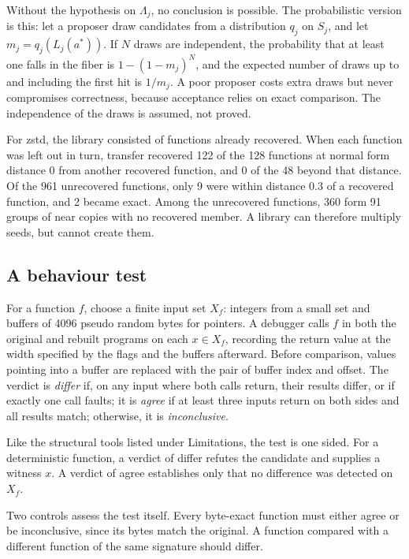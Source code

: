 \documentclass[11pt]{article}
\theoremstyle{definition}
\theoremstyle{remark}
\begin{document}
Without the hypothesis on $\Lambda_j$, no conclusion is possible. The probabilistic version is this: let a proposer draw candidates from a distribution $q_j$ on $S_j$, and let $m_j = q_j(L_j(a^*))$. If $N$ draws are independent, the probability that at least one falls in the fiber is $1 - (1 - m_j)^N$, and the expected number of draws up to and including the first hit is $1/m_j$. A poor proposer costs extra draws but never compromises correctness, because acceptance relies on exact comparison. The independence of the draws is assumed, not proved.

For zstd, the library consisted of functions already recovered. When each function was left out in turn, transfer recovered 122 of the 128 functions at normal form distance $0$ from another recovered function, and 0 of the 48 beyond that distance. Of the 961 unrecovered functions, only 9 were within distance $0.3$ of a recovered function, and 2 became exact. Among the unrecovered functions, 360 form 91 groups of near copies with no recovered member. A library can therefore multiply seeds, but cannot create them.

\subsection{A behaviour test}

For a function $f$, choose a finite input set $X_f$: integers from a small set and buffers of 4096 pseudo random bytes for pointers. A debugger calls $f$ in both the original and rebuilt programs on each $x \in X_f$, recording the return value at the width specified by the flags and the buffers afterward. Before comparison, values pointing into a buffer are replaced with the pair of buffer index and offset. The verdict is \emph{differ} if, on any input where both calls return, their results differ, or if exactly one call faults; it is \emph{agree} if at least three inputs return on both sides and all results match; otherwise, it is \emph{inconclusive}.

Like the structural tools listed under Limitations, the test is one sided. For a deterministic function, a verdict of differ refutes the candidate and supplies a witness $x$. A verdict of agree establishes only that no difference was detected on $X_f$.

Two controls assess the test itself. Every byte-exact function must either agree or be inconclusive, since its bytes match the original. A function compared with a different function of the same signature should differ.
\end{document}
